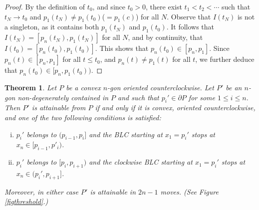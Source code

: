 \documentclass[11pt]{amsart}
\newtheorem{theorem}{Theorem}[section]
\theoremstyle{remark}
\numberwithin{equation}{section}
\renewcommand{\leq}{\leqslant}
\begin{document}
\begin{proof}
By the definition of $t_0$, and since $t_0>0$, there exist $t_1<t_2<\cdots$ such that $t_N\to t_0$ and $p_1(t_N)\neq p_1(t_0)$($=p_1(c)$) for all $N$. Observe  that $I(t_N)$ is not a singleton, as it contains both $p_1(t_N)$ and $p_1(t_0)$. It follows that $I(t_N) = [p_n(t_N), p_1(t_N)]$ for all $N$, and by continuity, that  $I(t_0)=[p_n(t_0), p_1(t_0)]$. This shows that  $p_n(t_0)\in [p_n,p_1]$. Since $p_n(t)\in [p_n,p_1]$ for all $t\leq t_0$, and $p_n(t)\neq p_1(t)$ for all $t$,
we further deduce that $p_n(t_0)\in [p_n,p_1(t_0))$.
\end{proof}




\begin{theorem}\label{thresholdthm}
Let $P$ be a convex $n$-gon oriented counterclockwise.  Let $P'$ be an $n$-gon non-degenerately contained in $P$ and such that $p_i'\in \partial P$ for some $1\leq i\leq n$. Then $P'$ is attainable from $P$ if and only if it is convex, oriented counterclockwise, and one of the two following conditions is satisfied:
\begin{enumerate}[(i)]
\item
$p_i'$ belongs to $(p_{i-1},p_i]$ and the BLC starting at $x_1=p_i'$ stops at $x_{n} \in [p_{i-1},p'_i)$.
\item
$p_i'$ belongs to $[p_i,p_{i+1})$ and the clockwise BLC starting at $x_1=p_i'$ stops at $x_{n} \in (p_i',p_{i+1}]$.
\end{enumerate}
Moreover, in either case $P'$ is attainable in $2n-1$ moves. (See Figure \ref{figthreshold}.)
\end{theorem}
\end{document}
